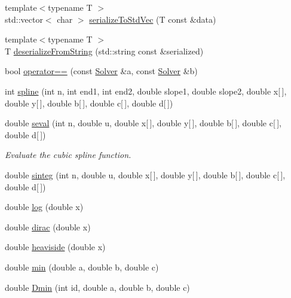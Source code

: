 \begin{DoxyCompactItemize}
\item 
{\footnotesize template$<$typename T $>$ }\\std\+::vector$<$ char $>$ \mbox{\hyperlink{namespaceamici_ad5b38b6ae6007acbaf43521f2a616937}{serialize\+To\+Std\+Vec}} (T const \&data)
\item 
{\footnotesize template$<$typename T $>$ }\\T \mbox{\hyperlink{namespaceamici_a863d35f9934623bc5f7f409a05fa0d67}{deserialize\+From\+String}} (std\+::string const \&serialized)
\item 
bool \mbox{\hyperlink{namespaceamici_a252a116a8f94abccc25b2086deb0734b}{operator==}} (const \mbox{\hyperlink{classamici_1_1_solver}{Solver}} \&a, const \mbox{\hyperlink{classamici_1_1_solver}{Solver}} \&b)
\item 
int \mbox{\hyperlink{namespaceamici_aa6801bbdb0c7625719c019ac287be29e}{spline}} (int n, int end1, int end2, double slope1, double slope2, double x\mbox{[}$\,$\mbox{]}, double y\mbox{[}$\,$\mbox{]}, double b\mbox{[}$\,$\mbox{]}, double c\mbox{[}$\,$\mbox{]}, double d\mbox{[}$\,$\mbox{]})
\item 
double \mbox{\hyperlink{namespaceamici_a20c8c27889853621fba3e0eacd333723}{seval}} (int n, double u, double x\mbox{[}$\,$\mbox{]}, double y\mbox{[}$\,$\mbox{]}, double b\mbox{[}$\,$\mbox{]}, double c\mbox{[}$\,$\mbox{]}, double d\mbox{[}$\,$\mbox{]})
\begin{DoxyCompactList}\small\item\em Evaluate the cubic spline function. \end{DoxyCompactList}\item 
double \mbox{\hyperlink{namespaceamici_a158da90aec69a4796fb6f350ac6b71ab}{sinteg}} (int n, double u, double x\mbox{[}$\,$\mbox{]}, double y\mbox{[}$\,$\mbox{]}, double b\mbox{[}$\,$\mbox{]}, double c\mbox{[}$\,$\mbox{]}, double d\mbox{[}$\,$\mbox{]})
\item 
double \mbox{\hyperlink{namespaceamici_adb302c9aafbaa5e180d9f60ee954bb82}{log}} (double x)
\item 
double \mbox{\hyperlink{namespaceamici_a30a33546875b9dd1a63c29312b316f7e}{dirac}} (double x)
\item 
double \mbox{\hyperlink{namespaceamici_a609b523b00064e82442c1f1519f40bdb}{heaviside}} (double x)
\item 
double \mbox{\hyperlink{namespaceamici_a0e1665a05c4dfee1572bea48f7930502}{min}} (double a, double b, double c)
\item 
double \mbox{\hyperlink{namespaceamici_a6eab5ae993f16386289c3d3e7da90435}{Dmin}} (int id, double a, double b, double c)

\end{DoxyCompactItemize}
